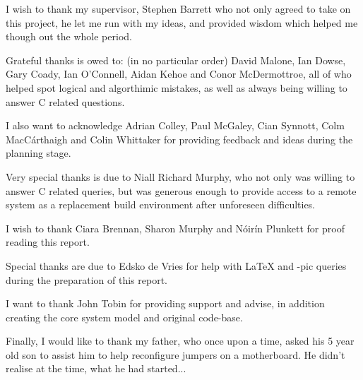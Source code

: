 
I wish to thank my supervisor, Stephen Barrett who not only
agreed to take on this project, he let me run with my ideas, and 
provided wisdom which helped me though out the whole period.

\vspace{5mm}

Grateful thanks is owed to: (in no particular order) David Malone, 
Ian Dowse, Gary Coady, Ian O'Connell, Aidan Kehoe and 
Conor McDermottroe, all of who helped spot logical and algorthimic 
mistakes, as well as always being willing to answer C related 
questions.


I also want to acknowledge Adrian Colley, Paul McGaley, Cian Synnott, 
Colm MacC\'{a}rthaigh and Colin Whittaker for providing feedback and 
ideas during the planning stage.


Very special thanks is due to Niall Richard Murphy, who not only was 
willing to answer C related queries, but was generous enough to provide 
access to a remote system as a replacement build environment after 
unforeseen difficulties.

\vspace{5mm}

I wish to thank Ciara Brennan, Sharon Murphy and N\'{o}ir\'{i}n Plunkett
for proof reading this report. 


Special thanks are due to Edsko de Vries for help with \textrm{\LaTeX{}} 
and \textrm{\Xy-pic} queries during the preparation of this report.

\vspace{5mm}

I want to thank John Tobin for providing support and advise, in 
addition creating the core system model and original code-base.

\vspace{5mm}

Finally, I would like to thank my father, who once upon a time, 
asked his 5 year old son to assist him to help reconfigure jumpers on
a motherboard. He didn't realise at the time, what he had started...
